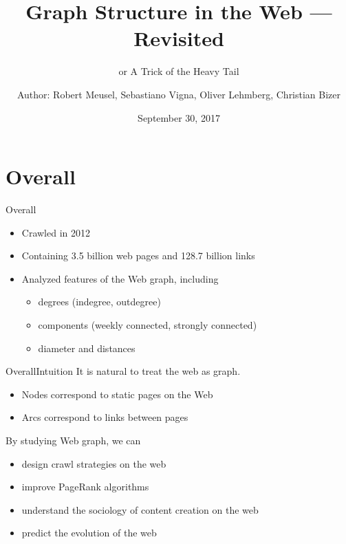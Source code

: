 \documentclass{beamer}
\title[Graph Structure in the Web --- Revisited]{Graph Structure in the Web --- Revisited}
\subtitle{or A Trick of the Heavy Tail}
\institute{}
\author[by Chen Shaoyuan]{Author: Robert Meusel, Sebastiano Vigna, Oliver Lehmberg, Christian Bizer}
\date{September 30, 2017}
\begin{document}
  \begin{frame}
    \titlepage
  \end{frame}

  \section{Overall}
  \begin{frame}{Overall}
    \begin{itemize}
      \item Crawled in 2012
      \item Containing 3.5 billion web pages and 128.7 billion links
      \item Analyzed features of the Web graph, including
      \begin{itemize}
        \item degrees (indegree, outdegree)
        \item components (weekly connected, strongly connected)
        \item diameter and distances
      \end{itemize}
    \end{itemize}
  \end{frame}

  \begin{frame}{Overall}{Intuition}
    It is natural to treat the web as graph.
    \begin{itemize}
      \item Nodes correspond to static pages on the Web
      \item Arcs correspond to links between pages
    \end{itemize}
    \pause
    By studying Web graph, we can
    \begin{itemize}
      \item design crawl strategies on the web
      \item improve PageRank algorithms
      \item understand the sociology of content creation on the web
      \item predict the evolution of the web
    \end{itemize}
  \end{frame}
\end{document}
